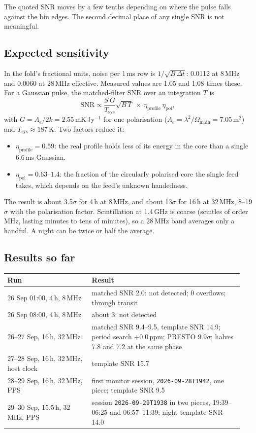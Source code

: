 \documentclass[11pt,a4paper]{article}
\newcommand{\code}[1]{\texttt{#1}}
\begin{document}
The quoted SNR moves by a few tenths depending on where the pulse falls against the bin edges. The second decimal place of any single SNR is not meaningful.

\subsection{Expected sensitivity}
\label{sec:expect}
In the fold's fractional units, noise per 1\,ms row is $1/\sqrt{B\,\Delta t}$: 0.0112 at 8\,MHz and 0.0060 at 28\,MHz effective. Measured values are 1.05 and 1.08 times these. For a Gaussian pulse, the matched-filter SNR over an integration $T$ is
\[
\mathrm{SNR} \propto \frac{S\,G}{T_\mathrm{sys}}\sqrt{B\,T}\ \times\ \eta_\mathrm{profile}\,\eta_\mathrm{pol},
\]
with $G = A_e/2k = 2.55$\,mK\,Jy$^{-1}$ for one polarisation ($A_e = \lambda^2/\Omega_\mathrm{main} = 7.05$\,m$^2$) and $T_\mathrm{sys} \approx 187$\,K. Two factors reduce it:
\begin{itemize}
\item $\eta_\mathrm{profile} = 0.59$: the real profile holds less of its energy in the core than a single 6.6\,ms Gaussian.
\item $\eta_\mathrm{pol} = 0.63$--$1.4$: the fraction of the circularly polarised core the single feed takes, which depends on the feed's unknown handedness.
\end{itemize}
The result is about 3.5$\sigma$ for 4\,h at 8\,MHz, and about 13$\sigma$ for 16\,h at 32\,MHz, 8--19$\sigma$ with the polarisation factor. Scintillation at 1.4\,GHz is coarse (scintles of order MHz, lasting minutes to tens of minutes), so a 28\,MHz band averages only a handful. A night can be twice or half the average.

\subsection{Results so far}
\begin{longtable}{@{}p{0.34\linewidth}p{0.61\linewidth}@{}}
\toprule
Run & Result \\
\midrule
26 Sep 01:00, 4\,h, 8\,MHz & matched SNR 2.0: not detected; 0 overflows; through transit \\
26 Sep 08:00, 4\,h, 8\,MHz & about 3: not detected \\
26--27 Sep, 16\,h, 32\,MHz & matched SNR 9.4--9.5, template SNR 14.9; period search +0.0\,ppm; PRESTO $9.9\sigma$; halves 7.8 and 7.2 at the same phase \\
27--28 Sep, 16\,h, 32\,MHz, host clock & template SNR 15.7 \\
28--29 Sep, 16\,h, 32\,MHz, PPS & first monitor session, \code{2026-09-28T1942}, one piece; template SNR 9.5 \\
29--30 Sep, 15.5\,h, 32\,MHz, PPS & session \code{2026-09-29T1938} in two pieces, 19:39--06:25 and 06:57--11:39; night template SNR 14.0 \\
\bottomrule
\end{longtable}
\end{document}
